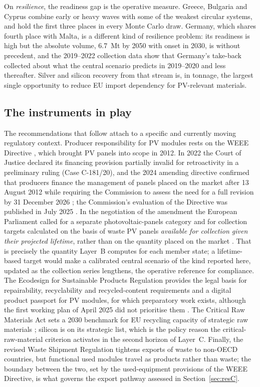 \documentclass[a4paper,fleqn]{cas-sc}
\begin{document}
On \emph{resilience}, the readiness gap is the operative measure. Greece, Bulgaria and Cyprus combine early or heavy waves with some of the weakest circular systems, and hold the first three places in every Monte Carlo draw. Germany, which shares fourth place with Malta, is a different kind of resilience problem: its readiness is high but the absolute volume, \SI{6.7}{Mt} by 2050 with onset in 2030, is without precedent, and the 2019--2022 collection data show that Germany's take-back collected about what the central scenario predicts in 2019--2020 and less thereafter. Silver and silicon recovery from that stream is, in tonnage, the largest single opportunity to reduce EU import dependency for PV-relevant materials.

\subsection{The instruments in play}
The recommendations that follow attach to a specific and currently moving regulatory context. Producer responsibility for PV modules rests on the WEEE Directive \citep{weee2012}, which brought PV panels into scope in 2012. In 2022 the Court of Justice declared its financing provision partially invalid for retroactivity in a preliminary ruling (Case C-181/20), and the 2024 amending directive confirmed that producers finance the management of panels placed on the market after 13 August 2012 while requiring the Commission to assess the need for a full revision by 31 December 2026 \citep{weee2024}; the Commission's evaluation of the Directive was published in July 2025 \citep{ec2025weee}. In the negotiation of the amendment the European Parliament called for a separate photovoltaic-panels category and for collection targets calculated on the basis of waste PV panels \emph{available for collection given their projected lifetime}, rather than on the quantity placed on the market \citep{weee2024}. That is precisely the quantity Layer~B computes for each member state; a lifetime-based target would make a calibrated central scenario of the kind reported here, updated as the collection series lengthens, the operative reference for compliance. The Ecodesign for Sustainable Products Regulation \citep{espr2024} provides the legal basis for repairability, recyclability and recycled-content requirements and a digital product passport for PV modules, for which preparatory work exists, although the first working plan of April 2025 did not prioritise them \citep{espr2025wp}. The Critical Raw Materials Act sets a 2030 benchmark for EU recycling capacity of strategic raw materials \citep{crma2024}; silicon is on its strategic list, which is the policy reason the critical-raw-material criterion activates in the second horizon of Layer~C. Finally, the revised Waste Shipment Regulation \citep{wsr2024} tightens exports of waste to non-OECD countries, but functional used modules travel as products rather than waste; the boundary between the two, set by the used-equipment provisions of the WEEE Directive, is what governs the export pathway assessed in Section~\ref{sec:resC}.
\end{document}
